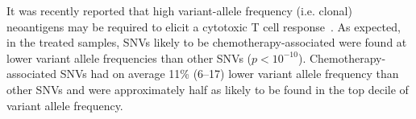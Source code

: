 
It was recently reported that high variant-allele frequency (i.e. clonal) neoantigens may be required to elicit a cytotoxic T cell response~\cite{McGranahan_2016}. As expected, in the treated samples, SNVs likely to be chemotherapy-associated were found at lower variant allele frequencies than other SNVs ($p < 10^{-10}$). Chemotherapy-associated SNVs had on average 11\% (6--17) lower variant allele frequency than other SNVs and were approximately half as likely to be found in the top decile of variant allele frequency.


